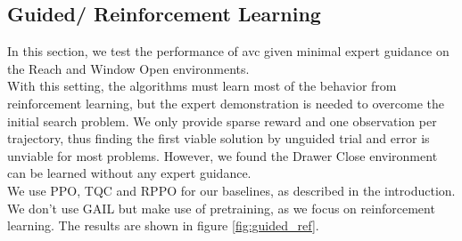 \subsection{Guided/ Reinforcement Learning}
\label{sec:g_ref_ler}
In this section, we test the performance of \ac{avc} given minimal expert guidance on the Reach and Window Open environments. \\
With this setting, the algorithms must learn most of the behavior from reinforcement learning, but the expert
demonstration is needed to overcome the initial search problem. We only provide sparse reward and one observation per trajectory, thus finding the first viable solution by unguided
trial and error is unviable for most problems. However, we found the Drawer Close environment can be learned without any expert guidance.\\

We use PPO, TQC and RPPO for our baselines, as described in the introduction. We don't use GAIL but make use of pretraining, as we focus on reinforcement learning. The results
are shown in figure \ref{fig:guided_ref}.\\

